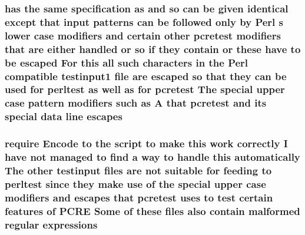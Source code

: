 \subsubsection[{\texorpdfstring{escapes}{escapes}}]{ has the same specification {\bf as} and {\bf so} {\bf can} {\bf be} {\bf given} {\bf identical} {\bf except} that {\bf input} {\bf patterns} {\bf can} {\bf be} followed only by {\bf Perl} {\bf s} lower {\bf case} {\bf modifiers} and certain other {\bf pcretest} {\bf modifiers} that {\bf are} either handled {\bf or} {\bf so} {\bf if} they contain {\bf or} these have {\bf to} {\bf be} escaped For {\bf this} {\bf all} such {\bf characters} {\bf in} the {\bf Perl} compatible testinput1 {\bf file} {\bf are} escaped {\bf so} that they {\bf can} {\bf be} {\bf used} for perltest {\bf as} well {\bf as} for {\bf pcretest} The {\bf special} {\bf upper} {\bf case} {\bf pattern} {\bf modifiers} such {\bf as} {\bf A} that {\bf pcretest} and its {\bf special} {\bf data} {\bf line} escapes}\hypertarget{perltest_8txt_abbb3e869b803191d7637f00cff24a9c6}{}\label{perltest_8txt_abbb3e869b803191d7637f00cff24a9c6}
\subsubsection[{\texorpdfstring{expressions}{expressions}}]{\setlength{\rightskip}{0pt plus 5cm}require Encode {\bf to} the {\bf script} {\bf to} {\bf make} {\bf this} work correctly {\bf I} have {\bf not} managed {\bf to} find {\bf a} {\bf way} {\bf to} {\bf handle} {\bf this} automatically The other testinput {\bf files} {\bf are} {\bf not} suitable for feeding {\bf to} perltest since they {\bf make} use {\bf of} the {\bf special} {\bf upper} {\bf case} {\bf modifiers} and {\bf escapes} that {\bf pcretest} uses {\bf to} test certain {\bf features} {\bf of} {\bf P\+C\+RE} Some {\bf of} these {\bf files} also contain malformed regular expressions}\hypertarget{perltest_8txt_a7df68229a6e0e55982138713459bcfb2}{}\label{perltest_8txt_a7df68229a6e0e55982138713459bcfb2}
